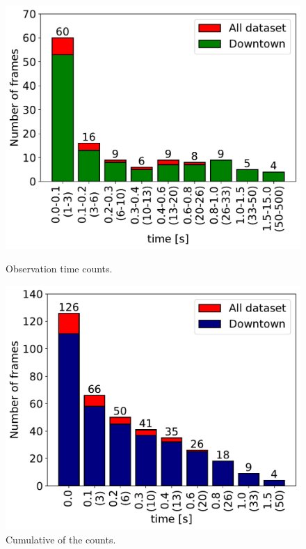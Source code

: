 \begin{figure}
    \centering
    \begin{minipage}{0.49\textwidth}
        \centering
        \includegraphics[width=\textwidth]{images/dreyeve/tracking_distrib.pdf}
        \caption{Observation time counts.}
        \label{fig:tracking_distribution}
    \end{minipage}\hfill
    \begin{minipage}{0.49\textwidth}
        \centering
        \includegraphics[width=\textwidth]{images/dreyeve/tracking_distrib_cum.pdf}
        \caption{Cumulative of the counts.}
        \label{fig:tracking_cum_distribution}
    \end{minipage}
\end{figure}


